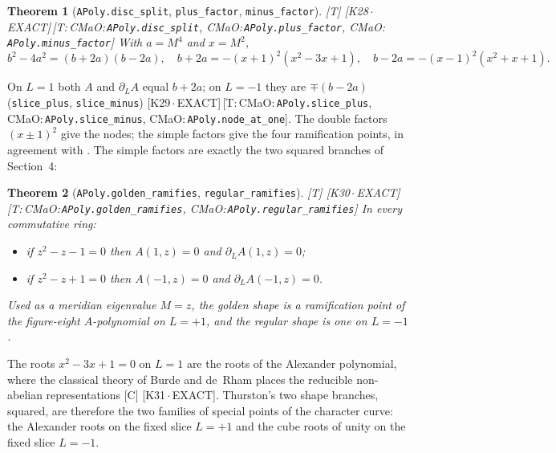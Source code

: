 \documentclass[11pt]{article}
\newtheorem{theorem}{Theorem}
\theoremstyle{definition}
\newcommand{\grade}[1]{\textsf{\small[#1]}}
\newcommand{\lean}[1]{\texttt{\small #1}}
\newcommand{\dtag}[1]{#1}
\begin{document}
\begin{theorem}[\lean{APoly.disc\_split}, \lean{plus\_factor}, \lean{minus\_factor}]\grade{T}\dtag{ \textsf{\small[K28\,$\cdot$\,EXACT]}\,\textsf{\small[T:\,CMaO:\,\lean{APoly.\allowbreak{}disc\_\allowbreak{}split}, CMaO:\,\lean{APoly.\allowbreak{}plus\_\allowbreak{}factor}, CMaO:\,\lean{APoly.\allowbreak{}minus\_\allowbreak{}factor}]}}
With $a=M^4$ and $x=M^2$,
\[ b^2-4a^2=(b+2a)(b-2a),\quad b+2a=-(x+1)^2(x^2-3x+1),\quad b-2a=-(x-1)^2(x^2+x+1). \]
\end{theorem}
On $L=1$ both $A$ and $\partial_LA$ equal $b+2a$; on $L=-1$ they are $\mp(b-2a)$ (\lean{slice\_plus}, \lean{slice\_minus})\dtag{ \textsf{\small[K29\,$\cdot$\,EXACT]}\,\textsf{\small[T:\,CMaO:\,\lean{APoly.\allowbreak{}slice\_\allowbreak{}plus}, CMaO:\,\lean{APoly.\allowbreak{}slice\_\allowbreak{}minus}, CMaO:\,\lean{APoly.\allowbreak{}node\_\allowbreak{}at\_\allowbreak{}one}]}}. The double factors $(x\pm1)^2$ give the nodes; the simple factors give the four ramification points, in agreement with \cite{BorotEynard}. The simple factors are exactly the two squared branches of Section~4:

\begin{theorem}[\lean{APoly.golden\_ramifies}, \lean{regular\_ramifies}]\grade{T}\dtag{ \textsf{\small[K30\,$\cdot$\,EXACT]}\,\textsf{\small[T:\,CMaO:\,\lean{APoly.\allowbreak{}golden\_\allowbreak{}ramifies}, CMaO:\,\lean{APoly.\allowbreak{}regular\_\allowbreak{}ramifies}]}}
In every commutative ring:
\begin{itemize}
\item if $z^2-z-1=0$ then $A(1,z)=0$ and $\partial_LA(1,z)=0$;
\item if $z^2-z+1=0$ then $A(-1,z)=0$ and $\partial_LA(-1,z)=0$.
\end{itemize}
Used as a meridian eigenvalue $M=z$, the golden shape is a ramification point of the figure-eight $A$-polynomial on $L=+1$, and the regular shape is one on $L=-1$.
\end{theorem}

The roots $x^2-3x+1=0$ on $L=1$ are the roots of the Alexander polynomial, where the classical theory of Burde and de~Rham places the reducible non-abelian representations \grade{C} \cite{Burde,deRham}\dtag{ \textsf{\small[K31\,$\cdot$\,EXACT]}}. Thurston's two shape branches, squared, are therefore the two families of special points of the character curve: the Alexander roots on the fixed slice $L=+1$ and the cube roots of unity on the fixed slice $L=-1$.
\end{document}
